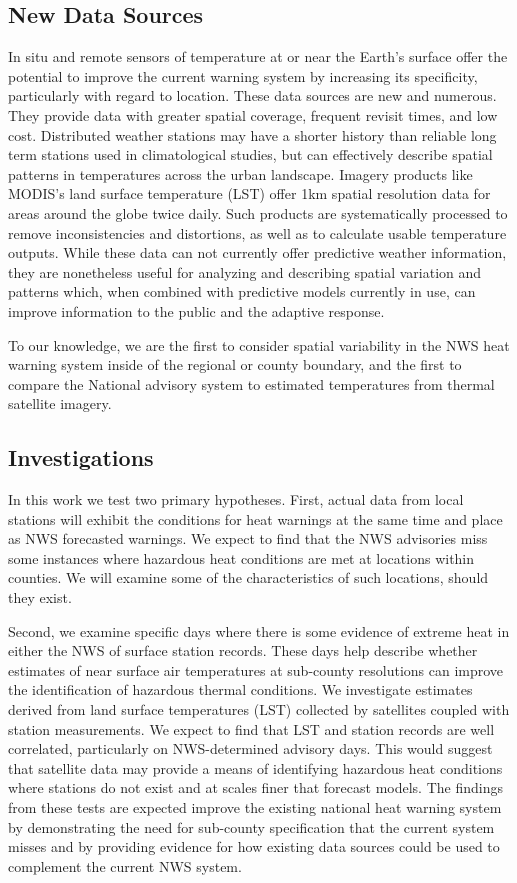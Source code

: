 \documentclass{ametsoc}
\begin{document}
\subsection{New Data Sources} \label{subsec:newDataSources}
In situ and remote sensors of temperature at or near the Earth's surface offer the potential to improve the current warning system by increasing its specificity, particularly with regard to location. These data sources are new and numerous. They provide data with greater spatial coverage, frequent revisit times, and low cost. Distributed weather stations may have a shorter history than reliable long term stations used in climatological studies, but can effectively describe spatial patterns in temperatures across the urban landscape. Imagery products like MODIS's land surface temperature (LST) offer 1km spatial resolution data for areas around the globe twice daily. Such products are systematically processed to remove inconsistencies and distortions, as well as to calculate usable temperature outputs. While these data can not currently offer predictive weather information, they are nonetheless useful for analyzing and describing spatial variation and patterns which, when combined with predictive models currently in use, can improve information to the public and the adaptive response.

To our knowledge, we are the first to consider spatial variability in the NWS heat warning system inside of the regional or county boundary, and the first to compare the National advisory system to estimated temperatures from thermal satellite imagery.

\subsection{Investigations} \label{subsec:hypotheses}
In this work we test two primary hypotheses. First, actual data from local stations will exhibit the conditions for heat warnings at the same time and place as NWS forecasted warnings. We expect to find that the NWS advisories miss some instances where hazardous heat conditions are met at locations within counties. We will examine some of the characteristics of such locations, should they exist. 

Second, we examine specific days where there is some evidence of extreme heat in either the NWS of surface station records. These days help describe whether estimates of near surface air temperatures at sub-county resolutions can improve the identification of hazardous thermal conditions. We investigate estimates derived from land surface temperatures (LST) collected by satellites coupled with station measurements. We expect to find that LST and station records are well correlated, particularly on NWS-determined advisory days. This would suggest that satellite data may provide a means of identifying hazardous heat conditions where stations do not exist and at scales finer that forecast models. The findings from these tests are expected improve the existing national heat warning system by demonstrating the need for sub-county specification that the current system misses and by providing evidence for how existing data sources could be used to complement the current NWS system. 
\end{document}
